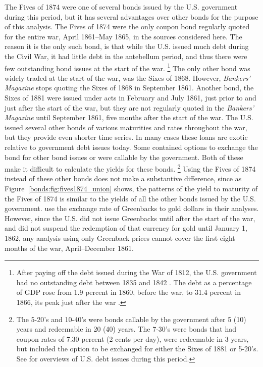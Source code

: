 The Fives of 1874 were one of several bonds issued by the U.S. government during this period, but it has several advantages over other bonds for the purpose of this analysis.
The Fives of 1874 were the only coupon bond regularly quoted for the entire war, April 1861--May 1865, in the sources considered here.
The reason it is the only such bond, is that while the U.S. issued much debt during the Civil War, it had little debt in the antebellum period, and thus there were few outstanding bond issues at the start of the war.
\footnote{
  After paying off the debt issued during the War of 1812, the U.S. government had no outstanding debt between 1835 and 1842 \parencite[297]{HomerSylla2005}.
  The debt as a percentage of GDP rose from 1.9 percent in 1860, before the war, to 31.4 percent in 1866, its peak just after the war \parencites{CBO2012}{CBO2012a}.
}
The only other bond was widely traded at the start of the war, was the Sixes of 1868.
However, \textit{Bankers' Magazine} stops quoting the Sixes of 1868 in September 1861.
Another bond, the  Sixes of 1881 were issued under acts in February and July 1861, just prior to and just after the start of the war, but they are not regularly quoted in the \textit{Bankers' Magazine} until September 1861, five months after the start of the war.
The U.S. issued several other bonds of various maturities and rates throughout the war, but they provide even shorter time series.
In many cases these loans are exotic relative to government debt issues today.
Some contained options to exchange the bond for other bond issues or were callable by the government. 
Both of these make it difficult to calculate the yields for these bonds.
\footnote{
  The 5-20's and 10-40's were bonds callable by the government after 5 (10) years and redeemable in 20 (40) years.
  The 7-30's were bonds that had coupon rates of 7.30 percent (2 cents per day), were redeemable in 3 years, but included the option to be exchanged for either the Sixes of 1881 or 5-20's.
  See \textcites{Bayley1882}{DeKnight1900}[297--309]{HomerSylla2005} for overviews of U.S. debt issues during this period.
}
Using the Fives of 1874 instead of these other bonds does not make a substantive difference, since as Figure~\ref{bonds:fig:fives1874_union} shows, the patterns of the yield to maturity of the Fives of 1874 is similar to the yields of all the other bonds issued by the U.S. government.
\textcites{WillardGuinnaneEtAl1996}{McCandless1996}{SmithSmith1997} use the exchange rate of Greenbacks to gold dollars in their analyses.
However, since the U.S. did not issue Greenbacks until after the start of the war, and did not suspend the redemption of that currency for gold until January 1, 1862, any analysis using only Greenback prices cannot cover the first eight months of the war, April--December 1861.
